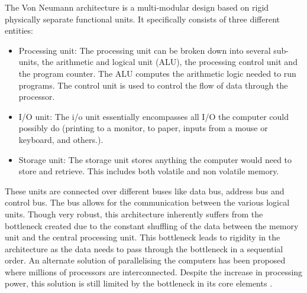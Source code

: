 The Von Neumann architecture is a multi-modular design based on rigid physically separate functional units. It specifically consists of three different entities:
\begin{itemize}
	\item Processing unit: The processing unit can be broken down into several sub-units, the arithmetic and logical unit (ALU), the processing control unit and the program counter. The ALU computes the arithmetic logic needed to run programs. The control unit is used to control the flow of data through the processor. 
	\item I/O unit: The i/o unit essentially encompasses all I/O the computer could possibly do (printing to a monitor, to paper, inputs from a mouse or keyboard, and others.).
	\item Storage unit: The storage unit stores anything the computer would need to store and retrieve. This includes both volatile and non volatile memory.
\end{itemize}

These units are connected over different buses like data bus, address bus and control bus. The bus allows for the communication between the various logical units. Though very robust, this architecture inherently suffers from the bottleneck created due to the constant shuffling of the data between the memory unit and the central processing unit. This bottleneck leads to rigidity in the architecture as the data needs to pass through the bottleneck in a sequential order. An alternate solution of parallelising the computers has been proposed where millions of processors are interconnected. Despite the increase in processing power, this solution is still limited by the bottleneck in its core elements \citep{schuller2016vonneumann}.

